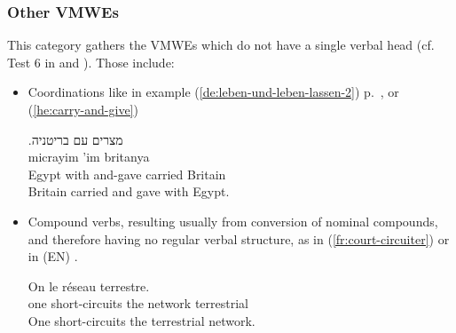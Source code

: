 \documentclass[output=paper,
modfonts,
]{langscibook}
\begin{document}
\subsubsection{Other VMWEs}
\label{sec:oth}
%
This category gathers the VMWEs which do not have a single verbal head (cf. Test 6 in  and ). Those include:
\begin{itemize}
\item Coordinations like in example (\ref{de:leben-und-leben-lassen-2}) p.~\pageref{de:leben-und-leben-lassen-2}, or (\ref{he:carry-and-give})


\ea \label{he:carry-and-give}
\settowidth {}
\glll .\textup{מצרים} \textup{עם}   \textup{בריטניה} \\
micrayim 'im   britanya \\ 
Egypt with and-gave carried Britain\\ 
\glt Britain carried and gave with Egypt. 
\z

\item Compound verbs, resulting usually from conversion of nominal com\-po\-unds, and therefore having no regular verbal structure, as in (\ref{fr:court-circuiter}) or in 
(EN) . 


\ea \label{fr:court-circuiter}
\settowidth {}
\gll On  le réseau terrestre. \\
one short-circuits the network terrestrial \\ 
\glt One short-circuits the terrestrial network. 
\z

\end{itemize}
\end{document}
